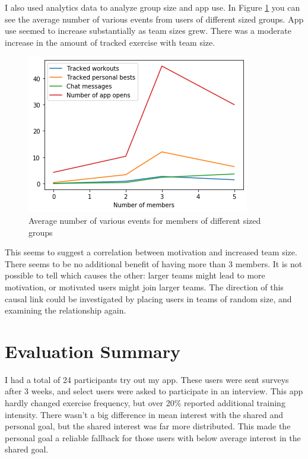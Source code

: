 \documentclass{l4proj}
\begin{document}
I also used analytics data to analyze group size and app use. In Figure \ref{fig:exercises} you can see the average number of various events from users of different sized groups. App use seemed to increase substantially as team sizes grew. There was a moderate increase in the amount of tracked exercise with team size.
\begin{figure}[H]
    \centering
    \includegraphics[width=1.0\linewidth]{data/activity.png}    
    \caption{Average number of various events for members of different sized groups}
    \label{fig:exercises} 
\end{figure}

This seems to suggest a correlation between motivation and increased team size. There seems to be no additional benefit of having more than 3 members. It is not possible to tell which causes the other: larger teams might lead to more motivation, or motivated users might join larger teams. The direction of this causal link could be investigated by placing users in teams of random size, and examining the relationship again.


\section{Evaluation Summary}
I had a total of 24 participants try out my app. These users were sent surveys after 3 weeks, and select users were asked to participate in an interview. This app hardly changed exercise frequency, but over 20\% reported additional training intensity. There wasn't a big difference in mean interest with the shared and personal goal, but the shared interest was far more distributed. This made the personal goal a reliable fallback for those users with below average interest in the shared goal. 
\end{document}

